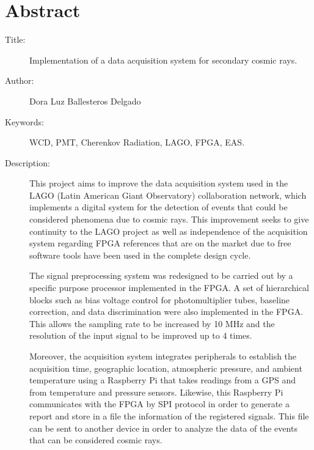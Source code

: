 \chapter*{Abstract}

\footnotesize{
\begin{description}
  \item[Title:] Implementation of a data acquisition system for secondary cosmic rays.
  \item[Author:] Dora Luz Ballesteros Delgado
  \item[Keywords:] WCD, PMT, Cherenkov Radiation, LAGO, FPGA, EAS.
  \item[Description:] 
This project aims to improve the data acquisition system used in the LAGO (Latin American Giant Observatory) collaboration network, which implements a digital system for the detection of events that could be considered phenomena due to cosmic rays.
This improvement seeks to give continuity to the LAGO project as well as independence of the acquisition system regarding FPGA references that are on the market due to free software tools have been used in the complete design cycle.

The signal preprocessing system was redesigned to be carried out by a specific purpose processor implemented in the FPGA.
A set of hierarchical blocks such as bias voltage control for photomultiplier tubes, baseline correction, and data discrimination were also implemented in the FPGA.
This allows the sampling rate to be increased by 10 MHz and the resolution of the input signal to be improved up to 4 times.

Moreover, the acquisition system integrates peripherals to establish the acquisition time, geographic location, atmospheric pressure, and ambient temperature using a Raspberry Pi that takes readings from a GPS and from temperature and pressure sensors.
Likewise, this Raspberry Pi communicates with the FPGA by SPI protocol in order to generate a report and store in a file the information of the registered signals.
This file can be sent to another device in order to analyze the data of the events that can be considered cosmic rays.

\end{description}}\normalsize
